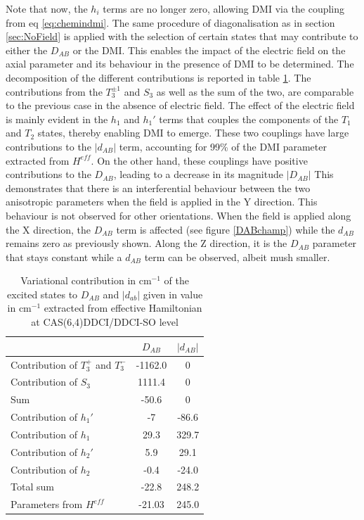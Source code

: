 \documentclass[10pt]{report}
\numberwithin{equation}{section}
\begin{document}
Note that now, the $h_i$ terms are no longer zero, allowing DMI via the coupling from eq \ref{eq:chemindmi}.
The same procedure of diagonalisation as in section \ref{sec:NoField} is applied with the selection of certain states that may contribute to either the $D_{AB}$ or the DMI.
This enables the impact of the electric field on the axial parameter and its behaviour in the presence of DMI to be determined.
The decomposition of the different contributions is reported in table \ref{tab:decompfield}.
The contributions from the $T_3^{\pm1}$ and $S_3$ as well as the sum of the two, are comparable to the previous case in the absence of electric field.
The effect of the electric field is mainly evident in the $h_1$ and $h_1'$ terms that couples the components of the $T_1$ and $T_2$ states, thereby enabling DMI to emerge.
These two couplings have large contributions to the $|d_{AB}|$ term, accounting for 99\% of the DMI parameter extracted from $H^{eff}$.
On the other hand, these couplings have positive contributions to the $D_{AB}$, leading to a decrease in its magnitude $|D_{AB}|$
This demonstrates that there is an interferential behaviour between the two anisotropic parameters when the field is applied in the Y direction.
This behaviour is not observed for other orientations. 
When the field is applied along the X direction, the $D_{AB}$ term is affected (see figure \ref{DABchamp}) while the $d_{AB}$ remains zero as previously shown.
Along the Z direction, it is the $D_{AB}$ parameter that stays constant while a $d_{AB}$ term can be observed, albeit mush smaller.

\begin{table}
    \centering
    \begin{tabular}{l c c}
        \hline
        \hline
         & $D_{AB}$ & $|d_{AB}|$\\
         \hline
         Contribution of $T_3^+$ and $T_3^-$& -1162.0& 0 \\
         Contribution of $S_3$& 1111.4 & 0\\
         Sum & -50.6 &0\\
         Contribution of $h_1'$ & -7 & -86.6\\
         Contribution of $h_1$& 29.3 & 329.7\\
         Contribution of $h_2'$& 5.9 & 29.1\\
         Contribution of $h_2$ & -0.4 & -24.0\\
         Total sum & -22.8  & 248.2\\
         Parameters from $H^{eff}$ & -21.03 & 245.0\\
         \hline
         \hline
    \end{tabular}
    \caption{Variational contribution in cm$^{-1}$ of the excited states to $D_{AB}$ and $|d_{ab}|$ given in value in cm$^{-1}$ extracted from effective Hamiltonian at CAS(6,4)DDCI/DDCI-SO level}
    \label{tab:decompfield}
\end{table}
\end{document}
